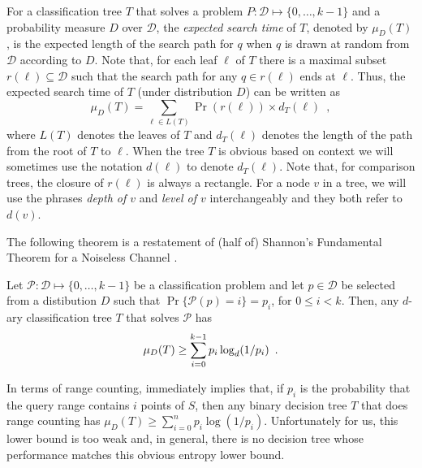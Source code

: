 \documentclass[charterfonts]{patmorin}
\newcommand{\depth}{d}
\begin{document}
For a classification tree $T$ that solves a problem
$P:\mathcal{D}\mapsto\{0,\ldots,k-1\}$ and a probability measure $D$
over $\mathcal{D}$, the \emph{expected search time} of $T$, denoted
by $\mu_D(T)$, is the
expected length of the search path for $q$ when $q$ is drawn at random
from $\mathcal{D}$ according to $D$.  Note that, for each leaf $\ell$
of $T$ there is a maximal subset $r(\ell)\subseteq \mathcal{D}$ such
that the search path for any $q\in r(\ell)$ ends at $\ell$.  Thus, the
expected search time of $T$ (under distribution $D$) can be written as
\[
     \mu_D(T) = \sum_{\ell\in L(T)} \Pr(r(\ell))\times \depth_T(\ell)
	\enspace ,
\]
where $L(T)$ denotes the leaves of $T$ and $\depth_T(\ell)$ denotes the
length of the path from the root of $T$ to $\ell$.  When the tree $T$
is obvious based on context we will sometimes use the notation
$d(\ell)$ to denote $d_T(\ell)$. Note that, for
comparison trees, the closure of $r(\ell)$ is always a rectangle.  For
a node $v$ in a tree, we will use the phrases \emph{depth of $v$} and
\emph{level of $v$} interchangeably and they both refer to $d(v)$. 

The following theorem is a restatement of (half of) Shannon's
Fundamental Theorem for a Noiseless Channel \cite[Theorem 9]{s48}.
\begin{thm}
Let $\mathcal{P}:\mathcal{D}\mapsto \{0,\ldots,k-1\}$ be a classification
problem and let $p\in \mathcal{D}$ be selected from a distibution $D$ such
that $\Pr\{\mathcal{P}(p)= i\}=p_i$, for $0\le i< k$.  Then, any
$d$-ary classification tree $T$ that solves $\mathcal{P}$ has
\begin{equation}
     \mu_D(T) \ge \sum_{i=0}^{k-1} p_i\log_d(1/p_i) \enspace .
	\eqlabel{shannon}
\end{equation}
\end{thm}

In terms of range counting,  immediately implies that,
if $p_i$ is the probability that the query range contains $i$ points
of $S$, then any binary decision tree $T$ that does range counting has
$\mu_D(T) \ge \sum_{i=0}^{n} p_i\log(1/p_i)$.  Unfortunately for us,
this lower bound is too weak and, in general, there is no decision
tree whose performance matches this obvious entropy lower bound.
\end{document}
